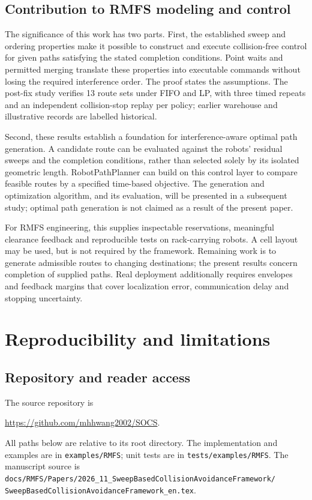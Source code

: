 \documentclass[11pt,a4paper]{article}
\theoremstyle{remark}
\newcounter{algorithm}
\begin{document}
\subsection{Contribution to RMFS modeling and control}
The significance of this work has two parts. First, the established sweep
and ordering properties make it possible to construct and execute
collision-free control for given paths satisfying the stated completion
conditions. Point waits and permitted merging translate these properties
into executable commands without losing the required interference order.
The proof states the assumptions. The post-fix study verifies 13 route sets
under FIFO and LP, with three timed repeats and an independent collision-stop
replay per policy; earlier warehouse and illustrative records are labelled historical.

Second, these results establish a foundation for interference-aware optimal
path generation. A candidate route can be evaluated against the robots'
residual sweeps and the completion conditions, rather than selected solely
by its isolated geometric length. RobotPathPlanner can build on this
control layer to compare feasible routes by a specified time-based
objective. The generation and optimization algorithm, and its evaluation,
will be presented in a subsequent study; optimal path generation is not
claimed as a result of the present paper.

For RMFS engineering, this supplies inspectable reservations, meaningful
clearance feedback and reproducible tests on rack-carrying robots. A cell
layout may be used, but is not required by the framework. Remaining work
is to generate admissible routes to changing destinations; the present
results concern completion of supplied paths. Real deployment additionally
requires envelopes and feedback margins that cover localization error,
communication delay and stopping uncertainty.

\section{Reproducibility and limitations}
\label{sec:reproducibility}

\subsection{Repository and reader access}
The source repository is
\begin{center}
\url{https://github.com/mhhwang2002/SOCS}.
\end{center}
All paths below are relative to its root directory. The implementation and
examples are in \nolinkurl{examples/RMFS}; unit tests are in
\nolinkurl{tests/examples/RMFS}. The manuscript source is
\nolinkurl{docs/RMFS/Papers/2026_11_SweepBasedCollisionAvoidanceFramework/}\allowbreak
\nolinkurl{SweepBasedCollisionAvoidanceFramework_en.tex}.
\end{document}
